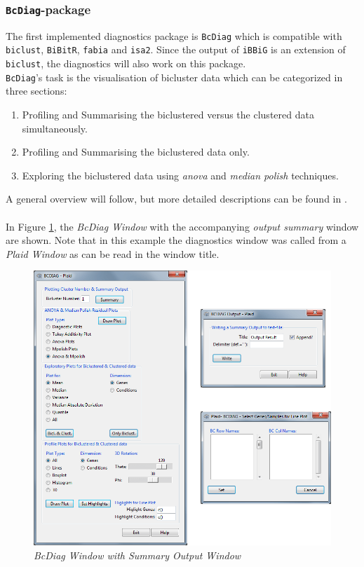 \documentclass[a4paper]{article}\usepackage[]{graphicx}\usepackage[]{color}
\begin{document}
\subsubsection{\texttt{BcDiag}-package}
The first implemented diagnostics package is \verb|BcDiag| which is compatible
with \verb|biclust|, \verb|BiBitR|, \verb|fabia| and \verb|isa2|. Since the output of \verb|iBBiG|
is an extension of \verb|biclust|, the diagnostics will also work on this
package.\\
\verb|BcDiag|'s task is the visualisation of bicluster data which can be
categorized in three sections:
\begin{enumerate}
  \item Profiling and Summarising the biclustered versus the clustered data
  simultaneously.
  \item Profiling and Summarising the biclustered data only.
  \item Exploring the biclustered data using {\it anova} and {\it median polish}
  techniques.
\end{enumerate}
\noindent A general overview will follow, but more detailed descriptions can be
found in \citet{Aregay2014}.
\\ \\
\noindent In Figure \ref{bcdiag_summary}, the {\it BcDiag Window}
with the accompanying {\it output summary} window are shown. Note that in this example the diagnostics
window was called from a {\it Plaid Window} as can be read in the window title.
\begin{figure}[H]
\centering
\includegraphics[scale=0.5]{figures/bcdiag_summary.png}
\caption{{\it BcDiag Window with Summary Output Window}\label{bcdiag_summary}}
\end{figure}
\end{document}
